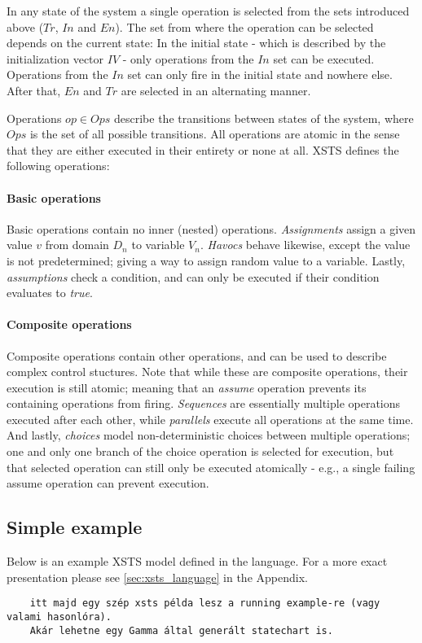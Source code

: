 In any state of the system a single operation is selected from the sets introduced above (\(Tr\), \(In\) and \(En\)). The set from where the operation can be selected depends on the current state: In the initial state - which is described by the initialization vector \(IV\) - only operations from the \(In\) set can be executed. Operations from the \(In\) set can only fire in the initial state and nowhere else. After that, \(En\) and \(Tr\) are selected in an alternating manner.

Operations \(op \in Ops\) describe the transitions between states of the system, where \(Ops\) is the set of all possible transitions. All operations are atomic in the sense that they are either executed in their entirety or none at all. XSTS defines the following operations:

\paragraph{Basic operations}

Basic operations contain no inner (nested) operations. \emph{Assignments} assign a given value \(v\) from domain \(D_n\) to variable \(V_n\). \emph{Havocs} behave likewise, except the value is not predetermined; giving a way to assign random value to a variable. Lastly, \emph{assumptions} check a condition, and can only be executed if their condition evaluates to \emph{true}.

\paragraph{Composite operations}

Composite operations contain other operations, and can be used to describe complex control stuctures. Note that while these are composite operations, their execution is still atomic; meaning that an \emph{assume} operation prevents its containing operations from firing. \emph{Sequences} are essentially multiple operations executed after each other, while \emph{parallels} execute all operations at the same time. And lastly, \emph{choices} model non-deterministic choices between multiple operations; one and only one branch of the choice operation is selected for execution, but that selected operation can still only be executed atomically - e.g., a single failing assume operation can prevent execution.

\subsection{Simple example}

Below is an example XSTS model defined in the language. For a more exact presentation please see \autoref{sec:xsts_language} in the Appendix.

\begin{Verbatim}
	itt majd egy szép xsts példa lesz a running example-re (vagy valami hasonlóra). 
	Akár lehetne egy Gamma által generált statechart is.
\end{Verbatim}

